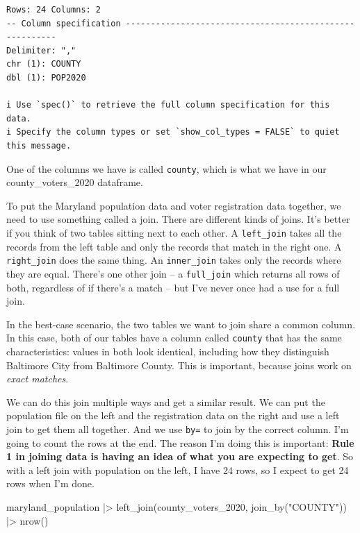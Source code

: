 \documentclass[
  letterpaper,
  DIV=11,
  numbers=noendperiod]{scrreprt}
\newenvironment{Shaded}{\begin{snugshade}}{\end{snugshade}}
\newcommand{\FunctionTok}[1]{\textcolor[rgb]{0.28,0.35,0.67}{#1}}
\newcommand{\NormalTok}[1]{\textcolor[rgb]{0.00,0.23,0.31}{#1}}
\newcommand{\SpecialCharTok}[1]{\textcolor[rgb]{0.37,0.37,0.37}{#1}}
\newcommand{\StringTok}[1]{\textcolor[rgb]{0.13,0.47,0.30}{#1}}
\begin{document}
\begin{verbatim}
Rows: 24 Columns: 2
-- Column specification --------------------------------------------------------
Delimiter: ","
chr (1): COUNTY
dbl (1): POP2020

i Use `spec()` to retrieve the full column specification for this data.
i Specify the column types or set `show_col_types = FALSE` to quiet this message.
\end{verbatim}

One of the columns we have is called \texttt{county}, which is what we
have in our county\_voters\_2020 dataframe.

To put the Maryland population data and voter registration data
together, we need to use something called a join. There are different
kinds of joins. It's better if you think of two tables sitting next to
each other. A \texttt{left\_join} takes all the records from the left
table and only the records that match in the right one. A
\texttt{right\_join} does the same thing. An \texttt{inner\_join} takes
only the records where they are equal. There's one other join -- a
\texttt{full\_join} which returns all rows of both, regardless of if
there's a match -- but I've never once had a use for a full join.

In the best-case scenario, the two tables we want to join share a common
column. In this case, both of our tables have a column called
\texttt{county} that has the same characteristics: values in both look
identical, including how they distinguish Baltimore City from Baltimore
County. This is important, because joins work on \emph{exact matches}.

We can do this join multiple ways and get a similar result. We can put
the population file on the left and the registration data on the right
and use a left join to get them all together. And we use \texttt{by=} to
join by the correct column. I'm going to count the rows at the end. The
reason I'm doing this is important: \textbf{Rule 1 in joining data is
having an idea of what you are expecting to get}. So with a left join
with population on the left, I have 24 rows, so I expect to get 24 rows
when I'm done.

\begin{Shaded}
\begin{Highlighting}[]
\NormalTok{maryland\_population }\SpecialCharTok{|\textgreater{}} \FunctionTok{left\_join}\NormalTok{(county\_voters\_2020, }\FunctionTok{join\_by}\NormalTok{(}\StringTok{"COUNTY"}\NormalTok{)) }\SpecialCharTok{|\textgreater{}} \FunctionTok{nrow}\NormalTok{()}
\end{Highlighting}
\end{Shaded}
\end{document}
